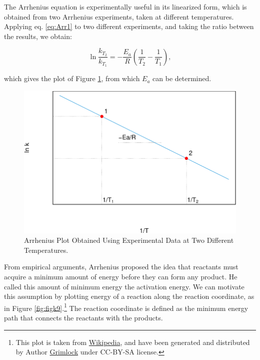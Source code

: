 \documentclass[
  9pt,
]{extbook}
\theoremstyle{definition}
\theoremstyle{definition}
\theoremstyle{definition}
\theoremstyle{definition}
\theoremstyle{remark}
\begin{document}
The Arrhenius equation is experimentally useful in its linearized form, which is obtained from two Arrhenius experiments, taken at different temperatures. Applying eq. \eqref{eq:Arr1} to two different experiments, and taking the ratio between the results, we obtain:

\begin{equation}
\ln \frac{k_{T_2}}{k_{T_1}}=-\frac{E_a}{R}\left(\frac{1}{T_2}-\frac{1}{T_1}\right),
\label{eq:Arr2}
\end{equation}

which gives the plot of Figure \ref{fig:figk8}, from which \(E_a\) can be determined.

\begin{figure}

{\centering \includegraphics{pchem1_files/figure-latex/figk8-1} 

}

\caption{Arrhenius Plot Obtained Using Experimental Data at Two Different Temperatures.}\label{fig:figk8}
\end{figure}

From empirical arguments, Arrhenius proposed the idea that reactants must acquire a minimum amount of energy before they can form any product. He called this amount of minimum energy the activation energy. We can motivate this assumption by plotting energy of a reaction along the reaction coordinate, as in Figure \ref{fig:figk9}.\footnote{This plot is taken from \href{https://en.wikipedia.org/wiki/Transition_state_theory}{Wikipedia}, and have been generated and distributed by Author \href{https://commons.wikimedia.org/wiki/User:Grimlock}{Grimlock} under CC-BY-SA license.} The reaction coordinate is defined as the minimum energy path that connects the reactants with the products.
\end{document}
